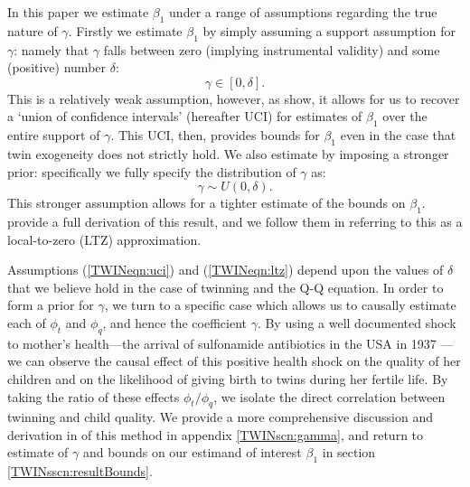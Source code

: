 \documentclass[subeqn]{article}
\begin{document}
\begin{spacing}{1.4}
In this paper we estimate $\beta_1$ under a range of assumptions regarding the
true nature of $\gamma$.  Firstly we estimate $\beta_1$ by simply assuming a
support assumption for $\gamma$: namely that $\gamma$ falls between zero (implying 
instrumental validity) and some (positive) number $\delta$:
\begin{equation}
\label{TWINeqn:uci}
\gamma \in [0,\delta].
\end{equation}
This is a relatively weak assumption, however, as \citet{Conleyetal2012} show,
it allows for us to recover a `union of confidence intervals' (hereafter UCI) 
for estimates of $\beta_1$ over the entire support of $\gamma$.  This UCI, then, 
provides bounds for $\beta_1$ even in the case that twin exogeneity does not 
strictly hold. We also estimate by imposing a stronger prior: specifically we 
fully specify the distribution of $\gamma$ as:
\begin{equation}
\label{TWINeqn:ltz}
\gamma \sim U(0,\delta).
\end{equation}
This stronger assumption allows for a tighter estimate of the bounds on 
$\beta_1$.  \citet{Conleyetal2012} provide a full derivation of this result, and 
we follow them in referring to this as a local-to-zero (LTZ) approximation.

Assumptions (\ref{TWINeqn:uci}) and (\ref{TWINeqn:ltz}) depend upon the values
of $\delta$ that we believe hold in the case of twinning and the Q-Q equation.
In order to form a prior for $\gamma$, we turn to a specific case which allows
us to causally estimate each of $\phi_t$ and $\phi_q$, and hence the coefficient
$\gamma$.  By using a well documented shock to mother's health---the arrival of 
sulfonamide antibiotics in the USA in 1937 \citep{BhalotraVenkataramani2014,
Jayachandranetal2010}--- we can observe the causal effect of this positive 
health shock on the quality of her children and on the likelihood of giving birth 
to twins during her fertile life.  By taking the ratio of these effects 
$\phi_t/\phi_q$, we isolate the direct correlation between twinning and child 
quality.  We provide a more comprehensive discussion and derivation in of this
method in appendix \ref{TWINscn:gamma}, and return to estimate of $\gamma$ and 
bounds on our estimand of interest $\beta_1$ in section \ref{TWINsscn:resultBounds}.



\end{spacing}
\end{document}

